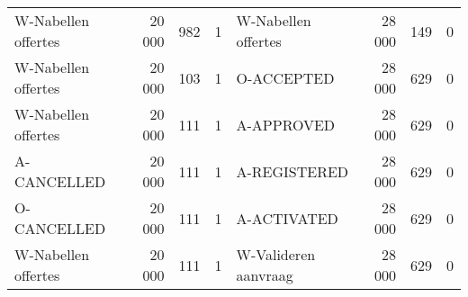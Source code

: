 \begin{table}
\begin{tabular}{lrlrlrlr}
W-Nabellen offertes & 20 000 & 982 & 1 & W-Nabellen offertes & 28 000 & 149 & 0 \\
W-Nabellen offertes & 20 000 & 103 & 1 & O-ACCEPTED & 28 000 & 629 & 0 \\
W-Nabellen offertes & 20 000 & 111 & 1 & A-APPROVED & 28 000 & 629 & 0 \\
A-CANCELLED & 20 000 & 111 & 1 & A-REGISTERED & 28 000 & 629 & 0 \\
O-CANCELLED & 20 000 & 111 & 1 & A-ACTIVATED & 28 000 & 629 & 0 \\
W-Nabellen offertes & 20 000 & 111 & 1 & W-Valideren aanvraag & 28 000 & 629 & 0 \\
\bottomrule
\end{tabular}
\end{table}
